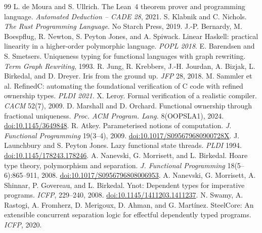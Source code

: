 \documentclass[a4paper,UKenglish,cleveref]{lipics-v2021}
\begin{document}
\begin{thebibliography}{99}
 L. de Moura and S. Ullrich. The Lean~4 theorem prover and
programming language. \emph{Automated Deduction -- CADE 28}, 2021.
 S. Klabnik and C. Nichols. \emph{The Rust Programming Language}.
No Starch Press, 2019.
 J.-P. Bernardy, M. Boespflug, R. Newton, S. Peyton Jones,
and A. Spiwack. Linear Haskell: practical linearity in a higher-order polymorphic
language. \emph{POPL 2018}.
 E. Barendsen and S. Smetsers. Uniqueness typing for functional
languages with graph rewriting. \emph{Term Graph Rewriting}, 1993.
 R. Jung, R. Krebbers, J.-H. Jourdan, A. Bizjak, L. Birkedal, and
D. Dreyer. Iris from the ground up. \emph{JFP} 28, 2018.
 M. Sammler et al. RefinedC: automating the foundational
verification of C code with refined ownership types. \emph{PLDI 2021}.
 X. Leroy. Formal verification of a realistic compiler.
\emph{CACM} 52(7), 2009.
 D. Marshall and D. Orchard. Functional ownership through
fractional uniqueness. \emph{Proc. ACM Program. Lang.} 8(OOPSLA1), 2024.
\href{https://doi.org/10.1145/3649848}{doi:10.1145/3649848}.
 R. Atkey. Parameterised notions of computation.
\emph{J. Functional Programming} 19(3--4), 2009.
\href{https://doi.org/10.1017/S095679680900728X}{doi:10.1017/S095679680900728X}.
 J. Launchbury and S. Peyton Jones. Lazy functional state threads.
\emph{PLDI} 1994. \href{https://doi.org/10.1145/178243.178246}{doi:10.1145/178243.178246}.
 A. Nanevski, G. Morrisett, and L. Birkedal.
Hoare type theory, polymorphism and separation.
\emph{J. Functional Programming} 18(5--6):865--911, 2008.
\href{https://doi.org/10.1017/S0956796808006953}{doi:10.1017/S0956796808006953}.
 A. Nanevski, G. Morrisett, A. Shinnar, P. Govereau, and L. Birkedal.
Ynot: Dependent types for imperative programs. \emph{ICFP}, 229--240, 2008.
\href{https://doi.org/10.1145/1411203.1411237}{doi:10.1145/1411203.1411237}.
 N. Swamy, A. Rastogi, A. Fromherz, D. Merigoux,
D. Ahman, and G. Mart\'inez. SteelCore: An extensible concurrent separation
logic for effectful dependently typed programs. \emph{ICFP}, 2020.
\end{thebibliography}
\end{document}
